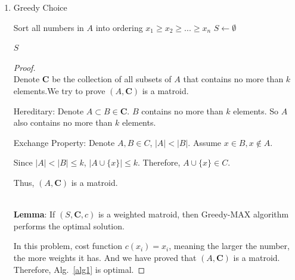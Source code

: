 \documentclass[12pt,a4paper]{article}
\makeatletter
\newtheorem*{solution}{Solution}
\theoremstyle{definition}
\renewenvironment{solution}[1][Solution] {\par\pushQED{\qed}\normalfont\topsep6\p@\@plus6\p@\relax\trivlist\item[\hskip\labelsep\bfseries#1\@addpunct{.}]\ignorespaces}{\popQED\endtrivlist\@endpefalse} \makeatother
\makeatother
\begin{document}
\begin{enumerate}
\begin{enumerate}
\begin{solution}
	      \begin{algorithm}[H]
   \caption{Greedy Choice}\label{alg1}
		Sort all numbers in $A$ into ordering $x_1\geq x_2\geq ...\geq x_n$\;
		$S\leftarrow \emptyset$\;
		
		\Return $S$\;	
	\end{algorithm}
	    \end{solution}
\begin{proof}
~\\
Denote $\mathbf{C}$ be the collection of all subsets of $A$ that contains no more than $k$ elements.We try to prove  $(A,\mathbf{C})$ is a matroid.

{\color{blue}Hereditary}: Denote $A\subset B\in \mathbf{C}$. $B$ contains no more than $k$ elements. So $A$ also contains no more than $k$ elements.

{\color{blue}Exchange Property}: Denote $A, B\in C$, $|A|<|B|$. Assume $x\in B, x\notin A$. 

Since $|A|<|B|\leq k$, $|A\cup \{x\}|\leq k$. Therefore, $A\cup \{x\} \in C$.

Thus, $(A,\mathbf{C})$ is a matroid.\par

~\\
\textbf{Lemma}: If $(S, \mathbf{C}, c)$ is a weighted matroid, then Greedy-MAX algorithm performs the optimal solution.\par

In this problem, cost function $c(x_i)=x_i$, meaning the larger the number, the more weights it has. And we have proved that $(A, \mathbf{C})$ is a matroid. Therefore, Alg.~\ref{alg1} is optimal.

\end{proof}
\end{enumerate}


\end{enumerate}
\end{document}
